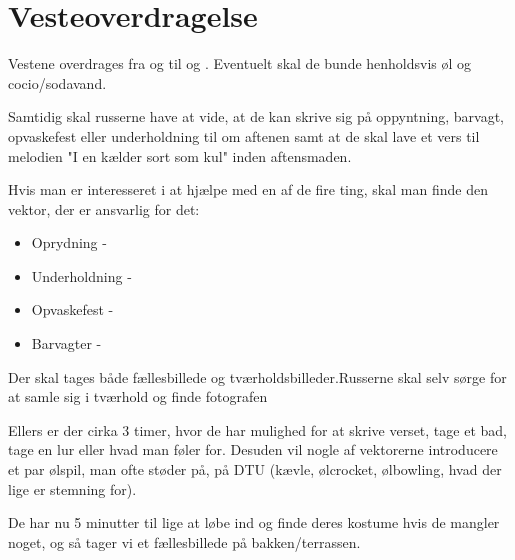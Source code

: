 \section{Vesteoverdragelse}
\label{sub:vaerelsefordeling}
Vestene overdrages fra \YOLO og \BIATCH til \Lucyfar og \Ora. Eventuelt skal de bunde henholdsvis øl og cocio/sodavand.

Samtidig skal russerne have at vide, at de kan skrive sig på oppyntning, barvagt, opvaskefest eller underholdning til om aftenen samt at de skal lave et vers til melodien "I en kælder sort som kul" inden aftensmaden.

Hvis man er interesseret i at hjælpe med en af de fire ting, skal man finde den vektor, der er ansvarlig for det:\\

\begin{multicols}{2}
\begin{itemize}
    \item Oprydning - \BIATCH
    \item Underholdning - \Johnny
    \item Opvaskefest - \YOLO
    \item Barvagter - \Gabriel
\end{itemize}
\end{multicols}

Der skal tages både fællesbillede og tværholdsbilleder.Russerne skal selv sørge for at samle sig i tværhold og finde fotografen \KABS 

Ellers er der cirka 3 timer, hvor de har mulighed for at skrive verset, tage et bad, tage en lur eller hvad man føler for. Desuden vil nogle af vektorerne introducere et par ølspil, man ofte støder på, på DTU (kævle, ølcrocket, ølbowling, hvad der lige er stemning for).

De har nu 5 minutter til lige at løbe ind og finde deres kostume hvis de mangler noget, og så tager vi et fællesbillede på bakken/terrassen.
